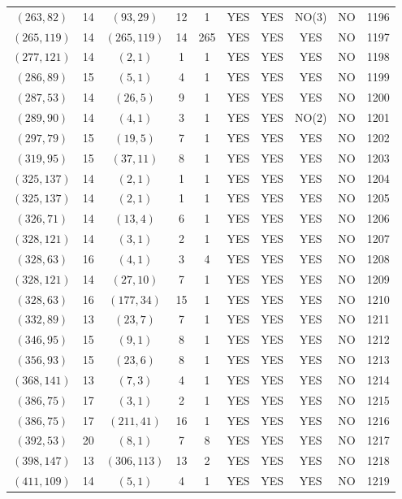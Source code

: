 \begin{longtable}{|c|c|c|c|c|c|c|c|c|c|}
$(263, 82)$ & 14 & $(93, 29)$ & 12 & 1 & YES & YES & NO(3) & NO & 1196\\
$(265, 119)$ & 14 & $(265, 119)$ & 14 & 265 & YES & YES & YES & NO & 1197\\
$(277, 121)$ & 14 & $(2, 1)$ & 1 & 1 & YES & YES & YES & NO & 1198\\
$(286, 89)$ & 15 & $(5, 1)$ & 4 & 1 & YES & YES & YES & NO & 1199\\
$(287, 53)$ & 14 & $(26, 5)$ & 9 & 1 & YES & YES & YES & NO & 1200\\
$(289, 90)$ & 14 & $(4, 1)$ & 3 & 1 & YES & YES & NO(2) & NO & 1201\\
$(297, 79)$ & 15 & $(19, 5)$ & 7 & 1 & YES & YES & YES & NO & 1202\\
$(319, 95)$ & 15 & $(37, 11)$ & 8 & 1 & YES & YES & YES & NO & 1203\\
$(325, 137)$ & 14 & $(2, 1)$ & 1 & 1 & YES & YES & YES & NO & 1204\\
$(325, 137)$ & 14 & $(2, 1)$ & 1 & 1 & YES & YES & YES & NO & 1205\\
$(326, 71)$ & 14 & $(13, 4)$ & 6 & 1 & YES & YES & YES & NO & 1206\\
$(328, 121)$ & 14 & $(3, 1)$ & 2 & 1 & YES & YES & YES & NO & 1207\\
$(328, 63)$ & 16 & $(4, 1)$ & 3 & 4 & YES & YES & YES & NO & 1208\\
$(328, 121)$ & 14 & $(27, 10)$ & 7 & 1 & YES & YES & YES & NO & 1209\\
$(328, 63)$ & 16 & $(177, 34)$ & 15 & 1 & YES & YES & YES & NO & 1210\\
$(332, 89)$ & 13 & $(23, 7)$ & 7 & 1 & YES & YES & YES & NO & 1211\\
$(346, 95)$ & 15 & $(9, 1)$ & 8 & 1 & YES & YES & YES & NO & 1212\\
$(356, 93)$ & 15 & $(23, 6)$ & 8 & 1 & YES & YES & YES & NO & 1213\\
$(368, 141)$ & 13 & $(7, 3)$ & 4 & 1 & YES & YES & YES & NO & 1214\\
$(386, 75)$ & 17 & $(3, 1)$ & 2 & 1 & YES & YES & YES & NO & 1215\\
$(386, 75)$ & 17 & $(211, 41)$ & 16 & 1 & YES & YES & YES & NO & 1216\\
$(392, 53)$ & 20 & $(8, 1)$ & 7 & 8 & YES & YES & YES & NO & 1217\\
$(398, 147)$ & 13 & $(306, 113)$ & 13 & 2 & YES & YES & YES & NO & 1218\\
$(411, 109)$ & 14 & $(5, 1)$ & 4 & 1 & YES & YES & YES & NO & 1219\\

\end{longtable}
